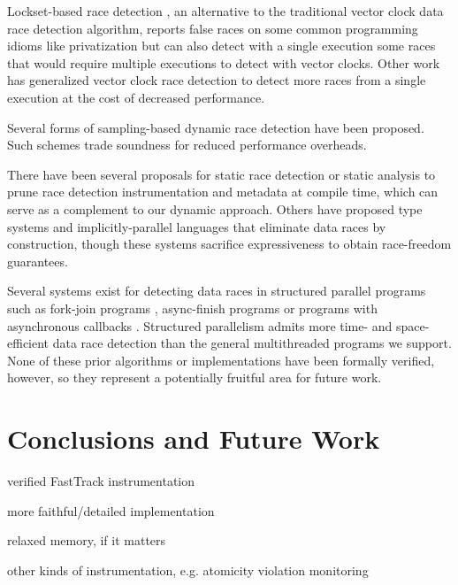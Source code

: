 \documentclass[preprint, 10pt]{sigplanconf}
\begin{document}
Lockset-based race detection \cite{dinning_detecting_1991,savage_eraser:_1997}, an alternative to the traditional vector clock data race detection algorithm, reports false races on some common programming idioms like privatization but can also detect with a single execution some races that would require multiple executions to detect with vector clocks. Other work has generalized vector clock race detection to detect more races from a single execution \cite{smaragdakis_sound_2012,sen_detecting_2005,chen_parametric_2007} at the cost of decreased performance.

Several forms of sampling-based dynamic race detection have been proposed. Such schemes trade soundness \cite{greathouse_demand-driven_2011,bond_pacer:_2010,marino_literace:_2009,erickson_effective_2010,effinger-dean_ifrit:_2012} for reduced performance overheads.

There have been several proposals for static race detection \cite{engler_racerx:_2003,naik_effective_2006} or static analysis \cite{flanagan_redcard:_2013,joserenau} to prune race detection instrumentation and metadata at compile time, which can serve as a complement to our dynamic approach. Others have proposed type systems \cite{abadi_types_2006,bocchino_type_2009,rust} and implicitly-parallel languages \cite{rinard_design_1998,guy_blelloch_nesl:_1992} that eliminate data races by construction, though these systems sacrifice expressiveness to obtain race-freedom guarantees.

Several systems exist for detecting data races in structured parallel programs such as fork-join programs \cite{john_mellor-crummey_--fly_1991,feng_efficient_1997,mai_zheng_grace:_2011,michael_boyer_automated_2008}, async-finish programs \cite{raman_scalable_2012} or programs with asynchronous callbacks \cite{petrov_race_2012,raychev_effective_2013,hsiao_race_2014,vechev_oopsla_2015}. Structured parallelism admits more time- and space-efficient data race detection than the general multithreaded programs we support. None of these prior algorithms or implementations have been formally verified, however, so they represent a potentially fruitful area for future work.


\section{Conclusions and Future Work}
verified FastTrack instrumentation

more faithful/detailed implementation

relaxed memory, if it matters

other kinds of instrumentation, e.g. atomicity violation monitoring




\end{document}
